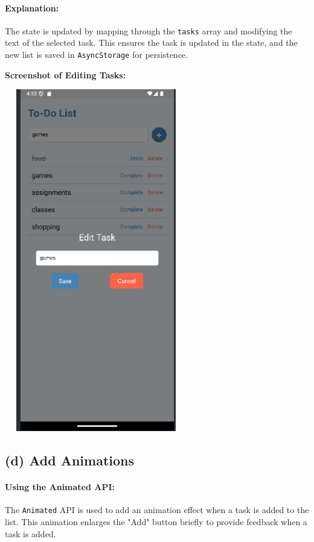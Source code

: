 \documentclass[12pt]{article}
\begin{document}
\paragraph{Explanation:}
The state is updated by mapping through the \texttt{tasks} array and modifying the text of the selected task. This ensures the task is updated in the state, and the new list is saved in \texttt{AsyncStorage} for persistence.

\textbf{Screenshot of Editing Tasks:}
\begin{center}
    \includegraphics[width=0.6\textwidth, height=15cm]{images/edittask3.png} 
\end{center}

\subsection*{(d) Add Animations}

\paragraph{Using the Animated API:}
The \texttt{Animated} API is used to add an animation effect when a task is added to the list. This animation enlarges the "Add" button briefly to provide feedback when a task is added.
\end{document}
